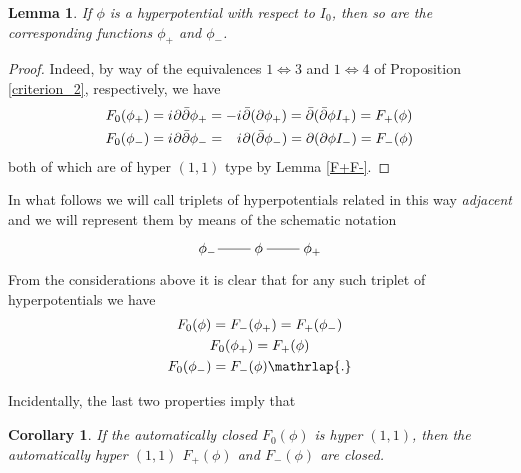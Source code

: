 \documentclass[11pt]{amsart}
\newtheorem{lemma}[theorem]{Lemma}
\newtheorem{corollary}[theorem]{Corollary}
\theoremstyle{remark}
\theoremstyle{remark}
\theoremstyle{definition}
\theoremstyle{definition}
\theoremstyle{definition}
\newcommand{\0}{{\scriptstyle 0'}} %
\newcommand{\1}{{\scriptstyle 1'}}
\newcommand{\hp}{\hspace{0.5pt}} %
\newcommand{\noarrow}{\mathord{\begin{tikzpicture}[baseline=-0.03ex, line width=0.3, scale=0.1]
\draw (0,1) -- (9.54,1);
\end{tikzpicture}}}
\begin{document}
\begin{lemma} \label{recurrence_lemma}
If $\phi$ is a hyperpotential with respect to $I_0$, then so are the corresponding functions $\phi_+$ and $\phi_-$.
\end{lemma}

\begin{proof}

Indeed, by way of the equivalences $1 \Leftrightarrow 3$ and $1 \Leftrightarrow 4$ of Proposition \ref{criterion_2}, respectively, we have
\begin{align}
\begin{split}
F_0(\phi_+) & = i\hp \partial\bar{\partial}\phi_+ = - i\hp \bar{\partial}(\partial\phi_+) = \bar{\partial}(\bar{\partial}\phi I_+) = F_+(\phi)  \\[0pt]
F_0(\phi_-) & = i\hp \partial\bar{\partial}\phi_- = \phantom{+} i\hp \partial(\bar{\partial}\phi_-) = \partial(\partial\phi I_-) = F_-(\phi)     
\end{split}
\end{align} 
both of which are of hyper $(1,1)$ type  by Lemma \ref{F+F-}.
\end{proof}

\noindent In what follows we will call triplets of hyperpotentials related in this way \textit{adjacent} and we will represent them by means of the schematic notation 
\begin{equation*}
\begin{tikzcd}
\phi_- \!\! \arrow[dash]{r} & \! \phi \! \arrow[dash]{r} & \! \phi_+
\end{tikzcd}
\end{equation*}
From the considerations above it is clear that for any such triplet of hyperpotentials we have
\begin{equation} \label{F_shifts}
\begin{gathered}
F_0(\phi) = F_-(\phi_+) = F_+(\phi_-) \\
F_0(\phi_+) = F_+(\phi) \\
F_0(\phi_-) = F_-(\phi) \mathrlap{.}
\end{gathered}
\end{equation}

\noindent Incidentally, the last two properties imply that

\begin{corollary}
If the automatically closed $F_0(\phi)$ is hyper $(1,1)$, then the automatically hyper $(1,1)$ $F_+(\phi)$ and $F_-(\phi)$ are closed. 
\end{corollary}
\end{document}
